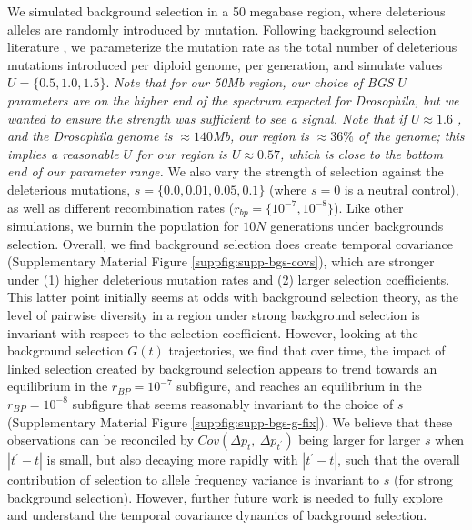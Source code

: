 \documentclass[11pt]{article}
\newcommand{\vb}[1]{{\it \color{blue} #1}}
\begin{document}
We simulated background selection in a 50 megabase region, where deleterious
alleles are randomly introduced by mutation. Following background selection
literature
\parencite{Charlesworth1993-gb,Nordborg1996-nq,Hudson1994-oh,Hudson1995-xc}, we
parameterize the mutation rate as the total number of deleterious mutations
introduced per diploid genome, per generation, and simulate values $U = \{0.5,
  1.0, 1.5\}$. \vb{Note that for our 50Mb region, our choice of BGS $U$
  parameters are on the higher end of the spectrum expected for
  \emph{Drosophila}, but we wanted to ensure the strength was sufficient to see
  a signal. Note that if $U \approx 1.6$ \parencite{Elyashiv2016-vt}, and the
\emph{Drosophila} genome is $\approx 140$Mb, our region is $\approx 36\%$ of
the genome; this implies a reasonable $U$ for our region is $U \approx 0.57$,
which is close to the bottom end of our parameter range.} We also vary the
strength of selection against the deleterious mutations, $s = \{0.0, 0.01,
0.05, 0.1\}$ (where $s=0$ is a neutral control), as well as different
recombination rates ($r_{bp} = \{10^{-7}, 10^{-8}\}$).  Like other simulations,
we burnin the population for $10N$ generations under backgrounds selection.
Overall, we find background selection does create temporal covariance
(Supplementary Material Figure \ref{suppfig:supp-bgs-covs}), which are stronger
under (1) higher deleterious mutation rates and (2) larger selection
coefficients. This latter point initially seems at odds with background
selection theory, as the level of pairwise diversity in a region under strong
background selection is invariant with respect to the selection coefficient.
However, looking at the background selection $G(t)$ trajectories, we find that
over time, the impact of linked selection created by background selection
appears to trend towards an equilibrium in the $r_{BP} = 10^{-7}$ subfigure,
and reaches an equilibrium in the $r_{BP} = 10^{-8}$ subfigure that seems
reasonably invariant to the choice of $s$ (Supplementary Material Figure
\ref{suppfig:supp-bgs-g-fix}). We believe that these observations can be
reconciled by $Cov(\Delta p_t,~ \Delta p_{t^{\prime}})$ being larger for larger
$s$ when $|t^{\prime}-t|$ is small, but also decaying more rapidly with
$|t^{\prime}-t|$, such that the overall contribution of selection to allele
frequency variance is invariant to $s$ (for strong background selection).
However, further future work is needed to fully explore and understand the
temporal covariance dynamics of background selection.
\end{document}
